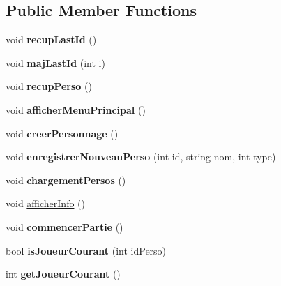 \subsection*{\-Public \-Member \-Functions}
\begin{DoxyCompactItemize}
\item 
\hypertarget{class_jeu_afc8d47d5af8133e555e0e02641dc03c9}{void {\bfseries recup\-Last\-Id} ()}\label{class_jeu_afc8d47d5af8133e555e0e02641dc03c9}

\item 
\hypertarget{class_jeu_ac2dc12316aef3df5ffc04ace0d2ca8a3}{void {\bfseries maj\-Last\-Id} (int i)}\label{class_jeu_ac2dc12316aef3df5ffc04ace0d2ca8a3}

\item 
\hypertarget{class_jeu_ac24053e79c6d689613eb43f33a849669}{void {\bfseries recup\-Perso} ()}\label{class_jeu_ac24053e79c6d689613eb43f33a849669}

\item 
\hypertarget{class_jeu_ae02adb2fa1ed4e84bc008fdea4c187a7}{void {\bfseries afficher\-Menu\-Principal} ()}\label{class_jeu_ae02adb2fa1ed4e84bc008fdea4c187a7}

\item 
\hypertarget{class_jeu_add76b474564ae0205343d3b995b43075}{void {\bfseries creer\-Personnage} ()}\label{class_jeu_add76b474564ae0205343d3b995b43075}

\item 
\hypertarget{class_jeu_a322a4c1a4084a44b0c5fb1cff5037391}{void {\bfseries enregistrer\-Nouveau\-Perso} (int id, string nom, int type)}\label{class_jeu_a322a4c1a4084a44b0c5fb1cff5037391}

\item 
\hypertarget{class_jeu_a7dd7448e4889305f0ea21679b16d2df1}{void {\bfseries chargement\-Persos} ()}\label{class_jeu_a7dd7448e4889305f0ea21679b16d2df1}

\item 
void \hyperlink{class_jeu_a40747c204660ad830d76378d0cbac1f0}{afficher\-Info} ()
\item 
\hypertarget{class_jeu_a0258b4e17a825904fa41213351bcd811}{void {\bfseries commencer\-Partie} ()}\label{class_jeu_a0258b4e17a825904fa41213351bcd811}

\item 
\hypertarget{class_jeu_a3fe3cdfb2476146d904fd9800eb932f4}{bool {\bfseries is\-Joueur\-Courant} (int id\-Perso)}\label{class_jeu_a3fe3cdfb2476146d904fd9800eb932f4}

\item 
\hypertarget{class_jeu_acc947eec44204b9f472a8b4b7fb41a25}{int {\bfseries get\-Joueur\-Courant} ()}\label{class_jeu_acc947eec44204b9f472a8b4b7fb41a25}


\end{DoxyCompactItemize}
